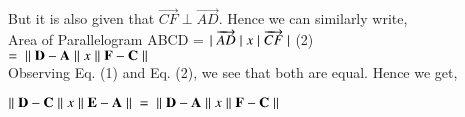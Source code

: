 \documentclass[journal,12pt,twocolumn]{IEEEtran}
\begin{document}
\vspace{0.25cm}
But it is also given that $\overrightarrow{CF} \perp \overrightarrow{AD}$. Hence we can similarly write,\\
\vspace{0.25cm}
Area of Parallelogram ABCD = $|\hspace{0.1cm} \overrightarrow{AD}\hspace{0.1cm}|\hspace{0.1cm}  x\hspace{0.1cm}|\hspace{0.1cm}  \overrightarrow{CF}\hspace{0.1cm}|$ \hspace{0.1cm} (2)\\
\vspace{0.25cm}
\hspace{4.5cm} $=\hspace{0.1cm} \|\hspace{0.1cm} \vec{D} - \vec{A} \hspace{0.1cm}\|\hspace{0.1cm} x\hspace{0.1cm} \|\hspace{0.1cm} \vec{F} - \vec{C}\hspace{0.1cm} \|$\\
\vspace{0.25cm}
Observing Eq. (1) and Eq. (2), we see that both are equal. Hence we get,\\
\vspace{0.25cm}
\centering

$ \|\hspace{0.1cm} \vec{D} - \vec{C} \hspace{0.1cm}\|\hspace{0.1cm} x\hspace{0.1cm} \|\hspace{0.1cm} \vec{E} - \vec{A}\hspace{0.1cm} \|\hspace{0.1cm} = \hspace{0.1cm} \|\hspace{0.1cm} \vec{D} - \vec{A} \hspace{0.1cm}\|\hspace{0.1cm} x\hspace{0.1cm} \|\hspace{0.1cm} \vec{F} - \vec{C}\hspace{0.1cm} \|  $

\vspace{0.25cm}
\end{document}
